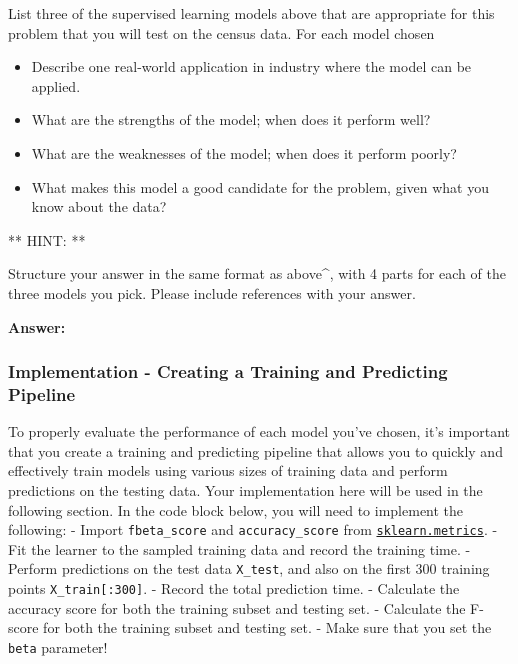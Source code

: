 \documentclass[11pt]{article}
\providecommand{\tightlist}{%
      \setlength{\itemsep}{0pt}\setlength{\parskip}{0pt}}
\begin{document}
List three of the supervised learning models above that are appropriate
for this problem that you will test on the census data. For each model
chosen

\begin{itemize}
\tightlist
\item
  Describe one real-world application in industry where the model can be
  applied.
\item
  What are the strengths of the model; when does it perform well?
\item
  What are the weaknesses of the model; when does it perform poorly?
\item
  What makes this model a good candidate for the problem, given what you
  know about the data?
\end{itemize}

** HINT: **

Structure your answer in the same format as above\^{}, with 4 parts for
each of the three models you pick. Please include references with your
answer.

    \textbf{Answer: }

    \subsubsection{Implementation - Creating a Training and Predicting
Pipeline}\label{implementation---creating-a-training-and-predicting-pipeline}

To properly evaluate the performance of each model you've chosen, it's
important that you create a training and predicting pipeline that allows
you to quickly and effectively train models using various sizes of
training data and perform predictions on the testing data. Your
implementation here will be used in the following section. In the code
block below, you will need to implement the following: - Import
\texttt{fbeta\_score} and \texttt{accuracy\_score} from
\href{http://scikit-learn.org/stable/modules/classes.html\#sklearn-metrics-metrics}{\texttt{sklearn.metrics}}.
- Fit the learner to the sampled training data and record the training
time. - Perform predictions on the test data \texttt{X\_test}, and also
on the first 300 training points \texttt{X\_train{[}:300{]}}. - Record
the total prediction time. - Calculate the accuracy score for both the
training subset and testing set. - Calculate the F-score for both the
training subset and testing set. - Make sure that you set the
\texttt{beta} parameter!
\end{document}
